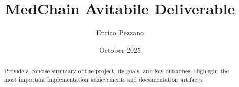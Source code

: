\documentclass[11pt,a4paper]{article}
\title{MedChain Avitabile Deliverable}
\author{Enrico Pezzano}
\date{October 2025}
\begin{document}
\maketitle

\begin{abstract}
Provide a concise summary of the project, its goals, and key outcomes. Highlight the most important implementation achievements and documentation artifacts.
\end{abstract}

\tableofcontents
\newpage









\nocite{botta2022towards,ateniese2017redactable,avitabile2024data}



\end{document}
